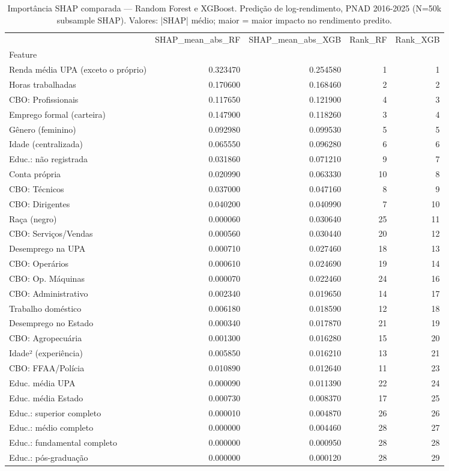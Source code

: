 \begin{table}
\caption{Importância SHAP comparada — Random Forest e XGBoost. Predição de log-rendimento, PNAD 2016-2025 (N=50k subsample SHAP). Valores: |SHAP| médio; maior = maior impacto no rendimento predito.}
\label{tab:shap_importance}
\begin{tabular}{lrrrr}
\toprule
 & SHAP_mean_abs_RF & SHAP_mean_abs_XGB & Rank_RF & Rank_XGB \\
Feature &  &  &  &  \\
\midrule
Renda média UPA (exceto o próprio) & 0.323470 & 0.254580 & 1 & 1 \\
Horas trabalhadas & 0.170600 & 0.168460 & 2 & 2 \\
CBO: Profissionais & 0.117650 & 0.121900 & 4 & 3 \\
Emprego formal (carteira) & 0.147900 & 0.118260 & 3 & 4 \\
Gênero (feminino) & 0.092980 & 0.099530 & 5 & 5 \\
Idade (centralizada) & 0.065550 & 0.096280 & 6 & 6 \\
Educ.: não registrada & 0.031860 & 0.071210 & 9 & 7 \\
Conta própria & 0.020990 & 0.063330 & 10 & 8 \\
CBO: Técnicos & 0.037000 & 0.047160 & 8 & 9 \\
CBO: Dirigentes & 0.040200 & 0.040990 & 7 & 10 \\
Raça (negro) & 0.000060 & 0.030640 & 25 & 11 \\
CBO: Serviços/Vendas & 0.000560 & 0.030440 & 20 & 12 \\
Desemprego na UPA & 0.000710 & 0.027460 & 18 & 13 \\
CBO: Operários & 0.000610 & 0.024690 & 19 & 14 \\
CBO: Op. Máquinas & 0.000070 & 0.022460 & 24 & 16 \\
CBO: Administrativo & 0.002340 & 0.019650 & 14 & 17 \\
Trabalho doméstico & 0.006180 & 0.018590 & 12 & 18 \\
Desemprego no Estado & 0.000340 & 0.017870 & 21 & 19 \\
CBO: Agropecuária & 0.001300 & 0.016280 & 15 & 20 \\
Idade² (experiência) & 0.005850 & 0.016210 & 13 & 21 \\
CBO: FFAA/Polícia & 0.010890 & 0.012640 & 11 & 23 \\
Educ. média UPA & 0.000090 & 0.011390 & 22 & 24 \\
Educ. média Estado & 0.000730 & 0.008370 & 17 & 25 \\
Educ.: superior completo & 0.000010 & 0.004870 & 26 & 26 \\
Educ.: médio completo & 0.000000 & 0.004460 & 28 & 27 \\
Educ.: fundamental completo & 0.000000 & 0.000950 & 28 & 28 \\
Educ.: pós-graduação & 0.000000 & 0.000120 & 28 & 29 \\
\bottomrule
\end{tabular}
\end{table}
